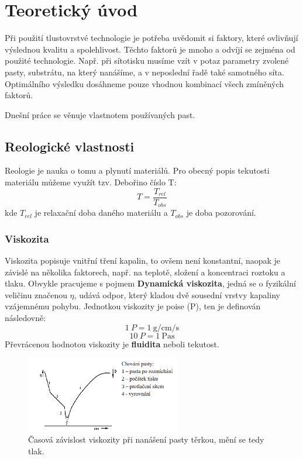 \documentclass{protokol}
\begin{document}
	\maketitle

\section{Teoretický úvod}
  Při použití tlustovrstvé technologie je potřeba uvědomit si faktory, které ovlivňují výslednou kvalitu a spolehlivost. Těchto faktorů je mnoho a odvíjí se zejména od použité technologie. 
  Např. při sítotisku musíme vzít v potaz parametry zvolené pasty, substrátu, na který nanášíme, a v neposlední řadě také samotného síta. Optimálního výsledku dosáhneme pouze vhodnou kombinací všech zmíněných faktorů. 

  Dnešní práce se věnuje vlastnotem používaných past. 
  
  \subsection{Reologické vlastnosti}
  Reologie je nauka o tomu a plynutí materiálů. Pro obecný popis tekutosti materiálu můžeme využít tzv. Debořino číslo T:
  \[
    T=  \frac{T_{rel}}{T_{obs} }
  \]
  kde \(T_{rel} \) je relaxační doba daného materiálu a \(T_{obs} \) je doba pozorování.
	
  \subsubsection{Viskozita}
    Viskozita popisuje vnitřní tření kapalin, to ovšem není konstantní, naopak je závislé na několika faktorech, např. na teplotě, složení a koncentraci roztoku a tlaku. 
    Obvykle pracujeme s pojmem \textbf{Dynamická viskozita}, jedná se o fyzikální veličinu značenou \(\eta\), udává odpor, který kladou dvě sousední vrstvy kapaliny vzájemnému pohybu. 
    Jednotkou viskozity je poise (P), ten je definován následovně:
    \[
      \qty{1}{P} = \qty{1}{\gram\per\centi\meter\per\second}
    \]
    \[  
        \qty{10}{P} = \qty{1}{\pascal\second}
    \]
    Převrácenou hodnotou viskozity je \textbf{fluidita} neboli tekutost. 

    \begin{figure}[h!]
      \centering
      \includegraphics[width=0.6\textwidth]{viskozita.png}
      \caption{Časová závislost viskozity při nanášení pasty těrkou, mění se tedy tlak.}
      \label{fig:viskozita-png}
    \end{figure}
    
\end{document}

